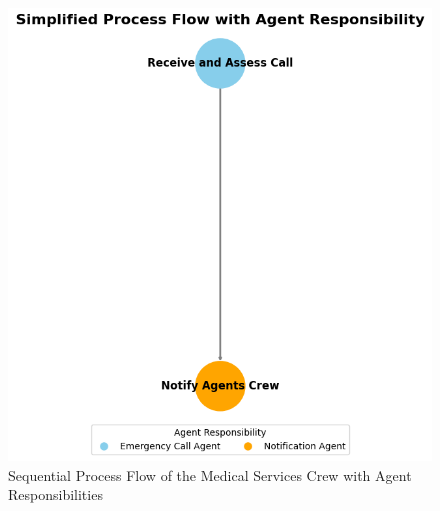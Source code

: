 \begin{figure}[h!]
	\centering
	\includegraphics[height=0.4\textheight]{figures/emergency_services_crew_flow.png}
	\caption{Sequential Process Flow of the Medical Services Crew with Agent Responsibilities}
	\label{fig:emergency_services_flow}
\end{figure}
